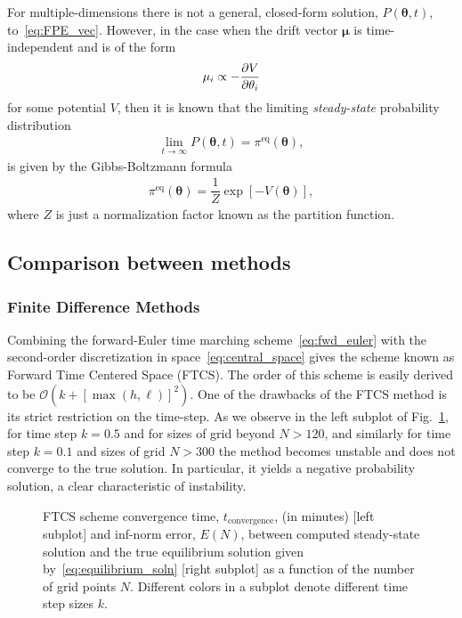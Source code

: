 \documentclass[10pt]{article}
\begin{document}
For multiple-dimensions there is not a general, closed-form solution, $P(\bm{\theta},t)$, to~\eqref{eq:FPE_vec}. However, in the case when the drift vector $\bm{\mu}$ is time-independent and is of the form
\begin{align}
    \mu_{i} \propto -\pdv{V}{\theta_{i}}
\end{align}
for some potential $V$, then it is known that the limiting \emph{steady-state} probability distribution
\begin{align}
    \lim\limits_{t\to\infty}P(\bm{\theta},t) = \pi^{\mathrm{eq}}(\bm{\theta}),
\end{align}
is given by the Gibbs-Boltzmann formula
\begin{align}
    \pi^{\mathrm{eq}}(\bm{\theta}) = \dfrac{1}{Z}\exp\left[-V(\bm{\theta})\right],\label{eq:equilibrium_soln}
\end{align}
where $Z$ is just a normalization factor known as the partition function. 

\subsection{Comparison between methods}

\subsubsection{Finite Difference Methods}

Combining the forward-Euler time marching scheme~\eqref{eq:fwd_euler} with the second-order discretization in space~\eqref{eq:central_space} gives the scheme known as Forward Time Centered Space (FTCS). The order of this scheme is easily derived to be $\mathcal{O}(k + [\max(h,\ell)]^{2})$. One of the drawbacks of the FTCS method is its strict restriction on the time-step. As we observe in the left subplot of Fig.~\ref{fig:ftcs_scheme}, for time step $k=0.5$ and for sizes of grid beyond $N > 120$, and similarly for time step $k=0.1$ and sizes of grid $N > 300$ the method becomes unstable and does not converge to the true solution. In particular, it yields a negative probability solution, a clear characteristic of instability. 

\begin{figure}[!h]
    \centering
    \caption{FTCS scheme convergence time, $t_{\mathrm{convergence}}$, (in minutes) [left subplot] and inf-norm error, $E(N)$, between computed steady-state solution and the true equilibrium solution given by~\eqref{eq:equilibrium_soln} [right subplot] as a function of the number of grid points $N$. Different colors in a subplot denote different time step sizes $k$. }
    \label{fig:ftcs_scheme}
\end{figure}
\end{document}
